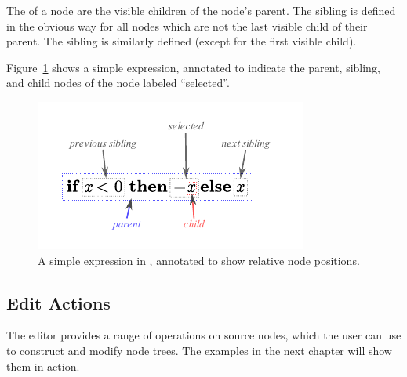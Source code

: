 The  of a node are the visible children of the node's parent. The  sibling is defined in the obvious way for all nodes which are not the last visible child of their parent. The  sibling is similarly defined (except for the first visible child). 

Figure~\ref{fig-position} shows a simple expression, annotated to indicate the parent, sibling, and child nodes of the node labeled ``selected''.

%  

\begin{figure}
  \begin{center}
  \includegraphics[scale=1.5]{src/image/position-ann.pdf}
  \end{center}
  
  \caption{A simple expression in \Meta, annotated to show relative node positions.}
  \label{fig-position}
\end{figure}


\subsection{Edit Actions}
The editor provides a range of operations on source nodes, which the user can use to construct and modify node trees. The examples in the next chapter will show them in action. 

